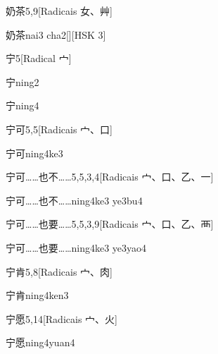 \begin{entry}{奶茶}{5,9}[Radicais ⼥、⾋]
  \begin{phonetics}{奶茶}{nai3 cha2}[][HSK 3]
  \end{phonetics}
\end{entry}

\begin{entry}{宁}{5}[Radical ⼧]
  \begin{phonetics}{宁}{ning2}
  \end{phonetics}
  \begin{phonetics}{宁}{ning4}
  \end{phonetics}
\end{entry}

\begin{entry}{宁可}{5,5}[Radicais ⼧、⼝]
  \begin{phonetics}{宁可}{ning4ke3}
  \end{phonetics}
\end{entry}

\begin{entry}{宁可……也不……}{5,5,3,4}[Radicais ⼧、⼝、⼄、⼀]
  \begin{phonetics}{宁可……也不……}{ning4ke3 ye3bu4}
  \end{phonetics}
\end{entry}

\begin{entry}{宁可……也要……}{5,5,3,9}[Radicais ⼧、⼝、⼄、⾑]
  \begin{phonetics}{宁可……也要……}{ning4ke3 ye3yao4}
  \end{phonetics}
\end{entry}

\begin{entry}{宁肯}{5,8}[Radicais ⼧、⾁]
  \begin{phonetics}{宁肯}{ning4ken3}
  \end{phonetics}
\end{entry}

\begin{entry}{宁愿}{5,14}[Radicais ⼧、⽕]
  \begin{phonetics}{宁愿}{ning4yuan4}
  \end{phonetics}
\end{entry}

